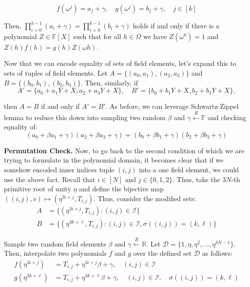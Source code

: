 \documentclass[../lecture-notes.tex]{subfiles}
\begin{document}
\begin{equation*}
    f(\omega^j) = a_j + \gamma, \quad g(\omega^j) = b_j + \gamma, \quad j \in [k]
\end{equation*}

Then, \(\prod_{i=0}^{k-1} (a_i + \gamma) = \prod_{i=0}^{k-1} (b_i + \gamma)\) holds if and only if there is a polynomial $Z \in \mathbb{F}[X]$ such that for all $h \in \Omega$ we have $Z(\omega^{0}) = 1$ and $Z(h)f(h) = g(h)Z(\omega h)$.

Now that we can encode equality of sets of field elements, let's expand this to sets of tuples of field elements. Let \(A = \{(a_0, a_1), (a_2, a_3)\}\) and \(B = \{(b_0, b_1), (b_2, b_3)\}\). Then, similarly, if
\[A' = \{a_0 + a_1Y + X, a_2 + a_3Y + X\}, \quad B' = \{b_0 + b_1Y + X, b_2 + b_3Y + X\},\]

then $A=B$ if and only if $A'=B'$. As before, we can leverage Schwartz-Zippel lemma to reduce this down into sampling two random $\beta$ and $\gamma \xleftarrow{R} \mathbb{F}$ and checking equality of:
\begin{equation*}
    (a_0 + \beta a_1 + \gamma)(a_2 + \beta a_3 + \gamma) = (b_0 + \beta b_1 + \gamma)(b_2 + \beta b_3 + \gamma)
\end{equation*}

\textbf{Permutation Check.} Now, to go back to the second condition of
 which we are trying to formulate in the polynomial
domain, it becomes clear that if we somehow encoded inner indices tuple $(i, j)$
into a one field element, we could use the above fact. Recall that $i \in [N]$
and $j \in \{0,1,2\}$. Thus, take the $3N$-th primitive root of unity $\eta$ and
define the bijective map $((i,j),v) \mapsto (\eta^{3i+j}, T_{i,j})$. Thus,
consider the modified sets:
\begin{align*}
    A &= \{(\eta^{3i+j}, T_{i,j}) : (i, j) \in \mathcal{I}\} \\
    B &= \{(\eta^{3k+\ell}, T_{i,j}) : (i, j) \in \mathcal{I}, \sigma((i, j)) = (k, \ell)\}
\end{align*}

Sample two random field elements $\beta$ and $\gamma \xleftarrow{R} \mathbb{R}$. Let $\mathcal{D} = \{1, \eta, \eta^2, \ldots, \eta^{3N-1}\}$. Then, interpolate two polynomials $f$ and $g$ over the defined set $\mathcal{D}$ as follows:
\begin{align*}
    f(\eta^{3i+j}) &= T_{i,j} + \eta^{3i+j}\beta + \gamma, \quad (i, j) \in \mathcal{I} \\
    g(\eta^{3k+\ell}) &= T_{i,j} + \eta^{3k+\ell}\beta + \gamma, \quad (i, j) \in \mathcal{I}, \quad \sigma((i, j)) = (k, \ell)
\end{align*}
\end{document}
